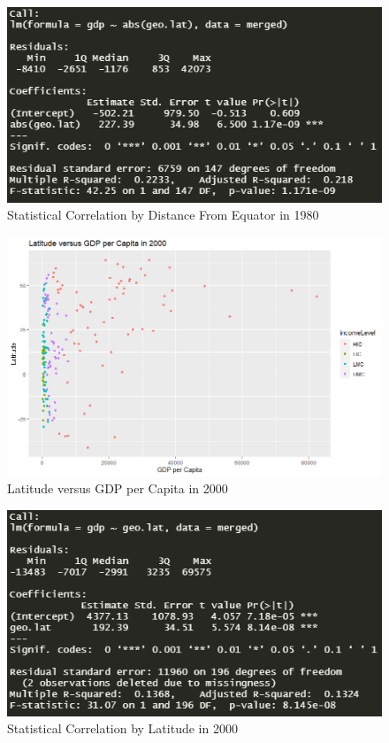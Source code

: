 \documentclass[15pt]{article}
\begin{document}
\begin{figure}[H]
    \centering
    \includegraphics[scale = 0.5]{Part1_dist_from_equator_r^2_1980.PNG}
    \caption{Statistical Correlation by Distance From Equator in 1980}
\end{figure}

\begin{figure}[H]
    \centering
    \includegraphics[scale = 0.5]{Part1_2000.png}
    \caption{Latitude versus GDP per Capita in 2000}
\end{figure}

\begin{figure}[H]
    \centering
    \includegraphics[scale = 0.5]{Part1_latitude_r^2_2000.PNG}
    \caption{Statistical Correlation by Latitude in 2000}
\end{figure}
\end{document}
